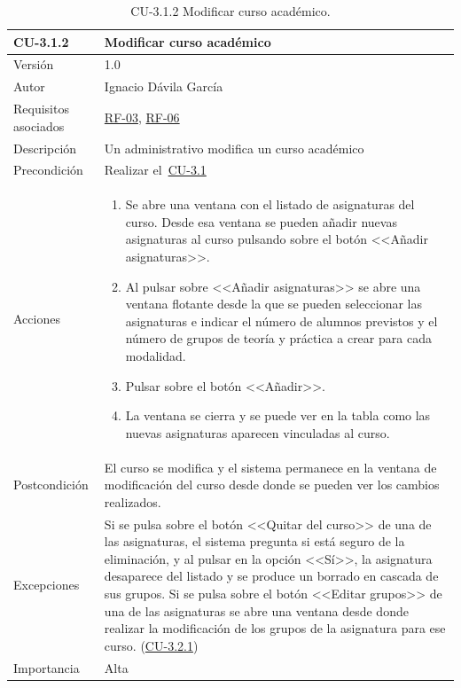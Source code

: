 \begin{table}[p]
	\centering
	\begin{tabularx}{\linewidth}{ p{} p{} }
		\toprule
		\textbf{CU-3.1.2}    & \textbf{Modificar curso académico}\\
		\toprule
		{\small Versión}              & 1.0    \\
		{\small Autor}                & Ignacio Dávila García \\
		{\small Requisitos asociados} & \hyperref[itm:RF3]{RF-03}, \hyperref[itm:RF6]{RF-06} \\
		{\small Descripción}          & Un administrativo modifica un curso académico \\
		{\small Precondición}         & Realizar el~\hyperref[table:CU-3_1]{CU-3.1} \\
		{\small Acciones}             &
		\begin{enumerate}
			\def\labelenumi{\arabic{enumi}.}
			\tightlist
			\item Se abre una ventana con el listado de asignaturas del curso. Desde esa ventana se pueden añadir nuevas asignaturas al curso pulsando sobre el botón <<Añadir asignaturas>>.
			\item Al pulsar sobre <<Añadir asignaturas>> se abre una ventana flotante desde la que se pueden seleccionar las asignaturas e indicar el número de alumnos previstos y el número de grupos de teoría y práctica a crear para cada modalidad. 
			\item Pulsar sobre el botón <<Añadir>>.
			\item La ventana se cierra y se puede ver en la tabla como las nuevas asignaturas aparecen vinculadas al curso.
		\end{enumerate}\\
		{\small Postcondición}        & El curso se modifica y el sistema permanece en la ventana de modificación del curso desde donde se pueden ver los cambios realizados. \\
		{\small Excepciones}          & Si se pulsa sobre el botón <<Quitar del curso>> de una de las asignaturas, el sistema pregunta si está seguro de la eliminación, y al pulsar en la opción <<Sí>>, la asignatura desaparece del listado y se produce un borrado en cascada de sus grupos. Si se pulsa sobre el botón <<Editar grupos>> de una de las asignaturas se abre una ventana desde donde realizar la modificación de los grupos de la asignatura para ese curso. (\hyperref[table:CU-3_2_1]{CU-3.2.1}) \\
		{\small Importancia}          & Alta \\
		\bottomrule
	\end{tabularx}
	\caption{CU-3.1.2 Modificar curso académico.}\label{table:CU-3_1_2}
\end{table}
\FloatBarrier


